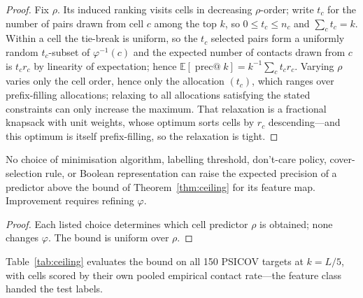 \begin{proof}
Fix $\rho$.  Its induced ranking visits cells in decreasing $\rho$-order; write
$t_c$ for the number of pairs drawn from cell $c$ among the top $k$, so
$0 \le t_c \le n_c$ and $\sum_c t_c = k$.  Within a cell the tie-break is
uniform, so the $t_c$ selected pairs form a uniformly random $t_c$-subset of
$\varphi^{-1}(c)$ and the expected number of contacts drawn from $c$ is
$t_c r_c$ by linearity of expectation; hence
$\mathbb{E}[\operatorname{prec@}k] = k^{-1}\sum_c t_c r_c$.  Varying $\rho$
varies only the cell order, hence only the allocation $(t_c)$, which ranges
over prefix-filling allocations; relaxing to all allocations satisfying the
stated constraints can only increase the maximum.  That relaxation is a
fractional knapsack with unit weights, whose optimum sorts cells by $r_c$
descending---and this optimum is itself prefix-filling, so the relaxation is
tight.
\end{proof}

\begin{corollary}
\label{cor:nomethod}
No choice of minimisation algorithm, labelling threshold, don't-care policy,
cover-selection rule, or Boolean representation can raise the expected
precision of a predictor above the bound of Theorem~\ref{thm:ceiling} for its
feature map.  Improvement requires refining $\varphi$.
\end{corollary}

\begin{proof}
Each listed choice determines which cell predictor $\rho$ is obtained; none
changes $\varphi$.  The bound is uniform over $\rho$.
\end{proof}

Table~\ref{tab:ceiling} evaluates the bound on all 150 PSICOV targets at
$k = L/5$, with cells scored by their own pooled empirical contact rate---the
feature class handed the test labels.

